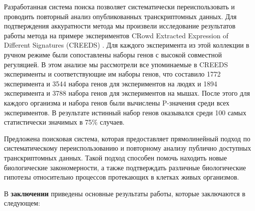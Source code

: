 Разработанная система поиска позволяет систематически переиспользовать и проводить повторный анализ опубликованных транскриптомных данных.
Для подтверждения аккуратности метода мы произвели исследование результатов работы метода на примере экспериментов CRowd Extracted Expression of Different Signatures (CREEDS) \cite{wang2016extraction}.
Для каждого эксперимента из этой коллекции в ручном режиме были сопоставлены наборы генов с высокой совместной регуляцией.
В этом анализе мы рассмотрели все упоминаемые в CREEDS эксперименты и соответствующие им наборы генов, что составило 1772 эксперимента и 3544 набора генов для экспериментов на людях и 1894 эксперимента и 3788 набора генов для экспериментов на мышах.
После этого для каждого организма и набора генов были вычислены P-значения среди всех экспериментов.
В результате истинный набор генов оказывался среди 100 самых статистически значимых в 75\% случаев.

Предложена поисковая система, которая предоставляет прямолинейный подход по систематическому переиспользованию и повторному анализу публично доступных транскриптомных данных.
Такой подход способен помочь находить новые биологические закономерности, а также подтверждать различные биологические гипотезы относительно процессов протекающих в клетках живых организмов.


\FloatBarrier
{}                                  %
В \textbf{заключении} приведены основные результаты работы, которые заключаются в следующем:



